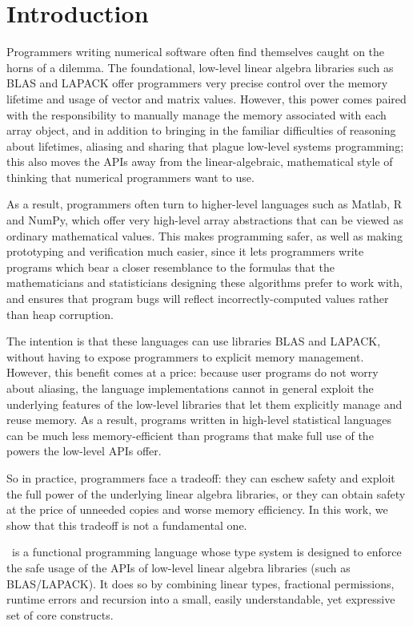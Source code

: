 \section{Introduction}

Programmers writing numerical software often find themselves caught on
the horns of a dilemma. The foundational, low-level linear algebra
libraries such as BLAS and LAPACK offer programmers very precise
control over the memory lifetime and usage of vector and matrix
values. However, this power comes paired with the responsibility to
manually manage the memory associated with each array object, and in
addition to bringing in the familiar difficulties of reasoning about
lifetimes, aliasing and sharing that plague low-level systems
programming; this also moves the APIs away from the linear-algebraic,
mathematical style of thinking that numerical programmers want to use.

As a result, programmers often turn to higher-level languages such as
Matlab, R and NumPy, which offer very high-level array abstractions
that can be viewed as ordinary mathematical values. This makes
programming safer, as well as making prototyping and verification much
easier, since it lets programmers write programs which bear a closer
resemblance to the formulas that the mathematicians and statisticians
designing these algorithms prefer to work with, and ensures that
program bugs will reflect incorrectly-computed values rather than heap
corruption.

The intention is that these languages can use libraries BLAS and
LAPACK, without having to expose programmers to explicit memory
management. However, this benefit comes at a price: because user
programs do not worry about aliasing, the language implementations
cannot in general exploit the underlying features of the low-level
libraries that let them explicitly manage and reuse memory. As a
result, programs written in high-level statistical languages can
be much less memory-efficient than programs that make full use
of the powers the low-level APIs offer. 

So in practice, programmers face a tradeoff: they can eschew safety
and exploit the full power of the underlying linear algebra libraries,
or they can obtain safety at the price of unneeded copies and worse
memory efficiency. In this work, we show that this tradeoff is not a
fundamental one.

\lang\ is a functional programming language whose type system is
designed to enforce the safe usage of the APIs of low-level linear algebra
libraries (such as BLAS/LAPACK).  It does so by combining linear types,
fractional permissions, runtime errors and recursion into a small, easily
understandable, yet expressive set of core constructs.

